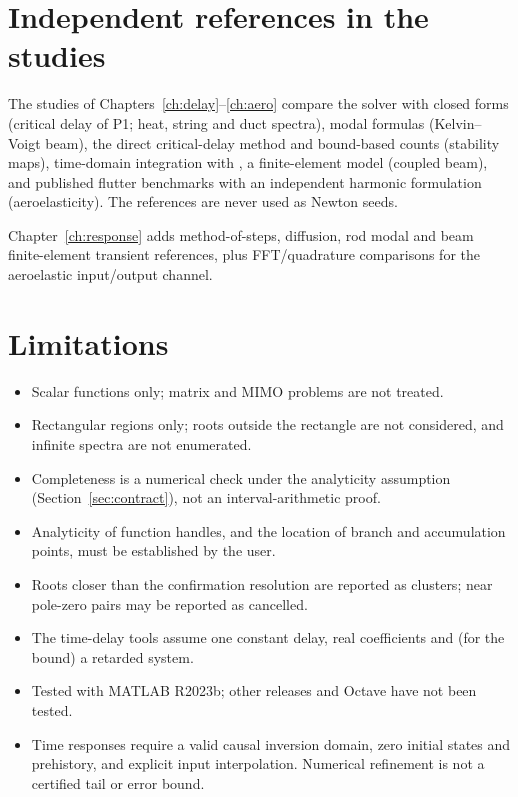 \section{Independent references in the studies}

The studies of Chapters~\ref{ch:delay}--\ref{ch:aero} compare the solver
with closed forms (critical delay of P1; heat, string and duct spectra),
modal formulas (Kelvin--Voigt beam), the direct critical-delay method and
bound-based counts (stability maps), time-domain integration with
, a finite-element model (coupled beam), and published flutter
benchmarks with an independent harmonic formulation (aeroelasticity). The references are
never used as Newton seeds.

Chapter~\ref{ch:response} adds method-of-steps, diffusion, rod modal and
beam finite-element transient references, plus FFT/quadrature comparisons
for the aeroelastic input/output channel.

\section{Limitations}

\begin{itemize}
  \item Scalar functions only; matrix and MIMO problems are not treated.
  \item Rectangular regions only; roots outside the rectangle are not
        considered, and infinite spectra are not enumerated.
  \item Completeness is a numerical check under the analyticity assumption
        (Section~\ref{sec:contract}), not an interval-arithmetic proof.
  \item Analyticity of function handles, and the location of branch and
        accumulation points, must be established by the user.
  \item Roots closer than the confirmation resolution are reported as
        clusters; near pole-zero pairs may be reported as cancelled.
  \item The time-delay tools assume one constant delay, real coefficients
        and (for the bound) a retarded system.
  \item Tested with MATLAB R2023b; other releases and Octave have not been
        tested.
  \item Time responses require a valid causal inversion domain, zero
        initial states and prehistory, and explicit input interpolation.
        Numerical refinement is not a certified tail or error bound.
\end{itemize}
